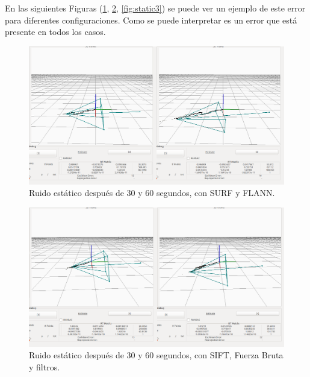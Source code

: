 En las siguientes Figuras (\ref{fig:static1}, \ref{fig:static2}, \ref{fig:static3}) se puede ver un ejemplo de este error para diferentes configuraciones. Como se puede interpretar es un error que está presente en todos los casos.

\begin{figure}[th]
\centering
\includegraphics[scale=0.3]{Figures/tests/static-surf-flann_2.png}
\decoRule
\caption[Ruido estático, con SURF y FLANN]{Ruido estático después de 30 y 60 segundos, con SURF y FLANN.}
\label{fig:static1}
\end{figure}

\begin{figure}[th]
\centering
\includegraphics[scale=0.3]{Figures/tests/static-filter_2.png}
\decoRule
\caption[Ruido estático, con SIFT, Fuerza Bruta y filtros]{Ruido estático después de 30 y 60 segundos, con SIFT, Fuerza Bruta y filtros.}
\label{fig:static2}
\end{figure}

